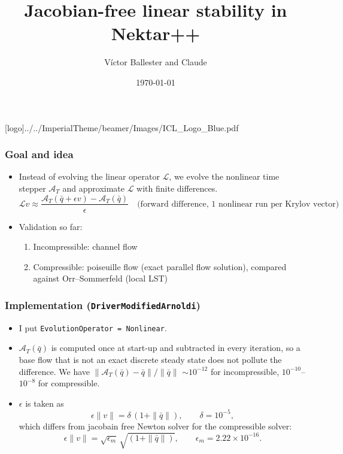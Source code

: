 \documentclass[
  aspectratio=169, %
  t, %
  onlytextwidth, %
  10pt, %
]{beamer}
\title{Jacobian-free linear stability in Nektar++} %
\author{Víctor Ballester and Claude} %
\date{\today} %
\def\imagefolder{../../ImperialTheme/beamer/Images}
\newcommand{\qb}{\bar{q}}
\newcommand{\PhiT}{\mathcal{A}_T}
\begin{document}
\begingroup
{} %
[logo]{\imagefolder/ICL_Logo_Blue.pdf} %
\frame[plain, s]{\titlepage} %
\endgroup

\begin{frame}
	\frametitle{Goal and idea}
	\begin{itemize}
		\item Instead of evolving the linear operator $\mathcal{L}$, we evolve the nonlinear time stepper $\PhiT$ and approximate $\mathcal{L}$ with finite differences.
		      \[
			      \mathcal{L} v \approx \frac{\PhiT(\qb + \epsilon v) - \PhiT(\qb)}{\epsilon} \quad\text{(forward difference, 1 nonlinear run per Krylov vector)}
		      \]
		\item Validation so far:
		\begin{enumerate}
			\item Incompressible: channel flow
			\item Compressible: poiseuille flow (exact parallel flow solution), compared against Orr--Sommerfeld (local LST)
		\end{enumerate}

	\end{itemize}
\end{frame}

\begin{frame}
	\frametitle{Implementation (\texttt{DriverModifiedArnoldi})}
	\begin{itemize}
		\item I put \texttt{EvolutionOperator = Nonlinear}. 
		\item $\PhiT(\qb)$ is computed once at start-up and subtracted in every iteration, so a base flow that is not an exact discrete steady state does not pollute the difference. We have $\|\PhiT(\qb)-\qb\|/\|\qb\|$ $\sim 10^{-12}$ for incompressible, $10^{-10}$--$10^{-8}$ for compressible.
		\item $\epsilon$ is taken as 
		      \[
			      \epsilon\|v\| = \delta\,(1+\|\qb\|), \qquad \delta = 10^{-5},
		      \]
		      which differs from jacobain free Newton solver for the compressible solver:
		      \[
			      \epsilon\|v\| = \sqrt{\epsilon_m}\,\sqrt{(1+\|\qb\|)}, \qquad \epsilon_m = 2.22\times10^{-16}.
		      \]
      \end{itemize}
\end{frame}
\end{document}
